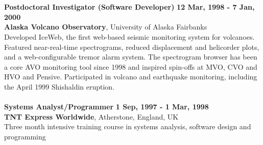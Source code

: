 \documentclass[margin,line]{res}
\begin{document}
\begin{resume}
\begin{comment}Highlights:\\
\begin{itemize}
\item Merged existing analog and digital networks into a single virtual network. This streamlined operations.
\item Collaborated with BGS Seismology to upgrade data acquisition systems to Earthworm.
\item Developed robust seismic alarm, analysis and archival systems around an Earthworm+Seisan core.
\item Got funding for new digital seismic network (approx. {\$}400k).
\item Developed automated system for locating pyroclastic flows.
\item Developed real-time energy-magnitude scale.
\item Seamlessly managed the move to the new observatory in Dec 2002/Jan 2003 without data loss.
\item Recovered and securely archived all MVO seismic data (several TB) from 500+ DDS-1 tapes, Zip disks \& CDs.
\item Initiated numerous projects focused on improving monitoring capabilities with university researchers scientists.
\end{itemize}
\end{comment}
\\
\hdashline
\\
{\bf Postdoctoral Investigator (Software Developer)} \hfill {\bf 12 Mar, 1998 - 7 Jan, 2000} \\
{\bf Alaska Volcano Observatory}, University of Alaska Fairbanks\\
Developed IceWeb, the first web-based seismic monitoring system for volcanoes. Featured near-real-time spectrograms, reduced displacement and helicorder plots, and a web-configurable tremor alarm system. The spectrogram browser has been a core AVO monitoring tool since 1998 and inspired spin-offs at MVO, CVO and HVO and Pensive. Participated in volcano and
earthquake monitoring, including the April 1999 Shishaldin eruption.
\\
\hdashline
\\
{\bf Systems Analyst/Programmer} \hfill {\bf 1 Sep, 1997 - 1 Mar, 1998}\\
{\bf TNT Express Worldwide}, Atherstone, England, UK\\
Three month intensive training course in systems analysis, software design and programming

\end{resume}
\end{document}
